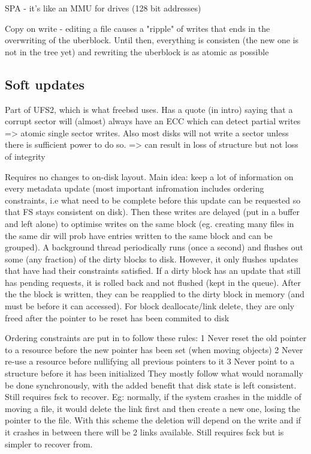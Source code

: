 \documentclass[a4paper]{report}
\begin{document}
        SPA - it's like an MMU for drives (128 bit addresses)

        Copy on write - editing a file causes a "ripple" of writes that ends in
        the overwriting of the uberblock. Until then, everything is consisten
        (the new one is not in the tree yet) and rewriting the uberblock is as
        atomic as possible

    \subsection{Soft updates}

        Part of UFS2, which is what freebsd uses. Has a quote (in intro) saying
        that a corrupt sector will (almost) always have an ECC which can detect
        partial writes => atomic single sector writes. Also most disks will not
        write a sector unless there is sufficient power to do so.
        => can result in loss of structure but not loss of integrity

        Requires no changes to on-disk layout. Main idea: keep a lot of
        information on every metadata update (most important infromation
        includes ordering constraints, i.e what need to be complete before this
        update can be requested so that FS stays consistent on disk). Then
        these writes are delayed (put in a buffer and left alone) to optimise
        writes on the same block (eg. creating many files in the same dir will
        prob have entries written to the same block and can be grouped). A
        background thread periodically runs (once a second) and flushes out
        some (any fraction) of the dirty blocks to disk. However, it only
        flushes updates that have had their constraints satisfied. If a dirty
        block has an update that still has pending requests, it is rolled back
        and not flushed (kept in the queue). After the the block is written,
        they can be reapplied to the dirty block in memory (and must be before
        it can accessed). For block deallocate/link delete, they are only freed
        after the pointer to be reset has been commited to disk

        Ordering constraints are put in to follow these rules:
          1 Never reset the old pointer to a resource before the new pointer has
            been set (when moving objects)
          2 Never re-use a resource before nullifying all previous pointers to
            it
          3 Never point to a structure before it has been initialized
        They mostly follow what would noramally be done synchronously, with the
        added benefit that disk state is left consistent. Still requires fsck
        to recover. Eg: normally, if the system crashes in the middle of moving
        a file, it would delete the link first and then create a new one,
        losing the pointer to the file. With this scheme the deletion will
        depend on the write and if it crashes in between there will be 2 links
        available. Still requires fsck but is simpler to recover from.
\end{document}
